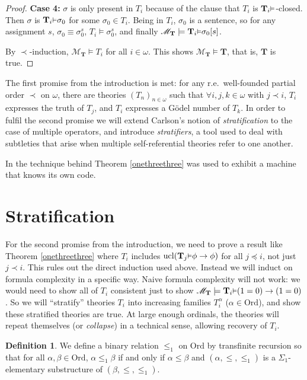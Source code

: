 \documentclass[reqno]{article}
\theoremstyle{definition}
\newtheorem{definition}[theorem]{Definition}
\def\M{\mathscr{M}}
\def\T{\mathbf{T}}
\def\Ord{\mathrm{Ord}}
\renewcommand{\Pr}[1]{\T_{#1}\mbox{\small${\vDash}$}}
\newcommand{\ucl}[1]{\mathrm{ucl}(#1)}
\newcommand{\case}[1]{\textbf{Case #1:}}
\begin{document}
\begin{proof}
\item
\case4
$\sigma$ is only present in $T_i$ because of the clause that $T_i$
is $\Pr i$-closed.
Then $\sigma$ is $\Pr i\sigma_0$ for some $\sigma_0\in T_i$.
Being in $T_i$, $\sigma_0$ is a sentence, so for any assignment $s$,
$\sigma_0\equiv\sigma^s_0$, $T_i\models\sigma^s_0$,
and finally $\M_\T\models \Pr i\sigma_0[s]$.

\item
By $\prec$-induction, $\M_\T\models T_i$ for all $i\in\omega$.
This shows $\M_\T\models\T$, that is, $\T$ is true.
\end{proof}

The first promise from the introduction is met: for any
r.e.~well-founded partial order $\prec$ on $\omega$, there are theories
$(T_n)_{n\in\omega}$ such that $\forall i,j,k\in\omega$ with $j\prec i$, $T_i$ expresses
the truth of $T_j$, and $T_i$ expresses a G\"odel number of $T_k$.
In order to fulfil the second promise
we will extend Carlson's notion of \emph{stratification} to the case of multiple
operators, and introduce \emph{stratifiers}, a tool used to deal with subtleties
that arise when multiple self-referential theories refer to one another.

In \cite{alexandercode} the technique behind Theorem \ref{onethreethree}
was used to exhibit a machine that knows its own code.


\section{Stratification}
\label{stratificationsection}

For the second promise from the introduction, we need to prove a result
like Theorem \ref{onethreethree} where $T_i$ includes
$\ucl{\Pr j\phi\rightarrow\phi}$ for all $j\preceq i$, not just $j\prec i$.
This rules out the direct induction
used above.  Instead we will induct on formula complexity in a
specific way.  Naive formula complexity will not work: we would need to show all of
$T_i$ consistent just to show $\M_\T\models\Pr i(1=0)\rightarrow(1=0)$.
So we will ``stratify'' theories $T_i$ into increasing families $T^\alpha_i$
($\alpha\in \Ord$),
and show these stratified theories are true.  At large enough ordinals,
the theories will repeat themselves (or
\emph{collapse}) in a technical sense, allowing recovery of $T_i$.

\begin{definition}
We define a binary relation $\leq_1$ on $\mathrm{Ord}$ by transfinite recursion
so that for all $\alpha,\beta\in\mathrm{Ord}$, $\alpha\leq_1\beta$ if and only if
$\alpha\leq\beta$ and $(\alpha,\leq,\leq_1)$ is a $\Sigma_1$-elementary substructure
of $(\beta,\leq,\leq_1)$.
\end{definition}
\end{document}
